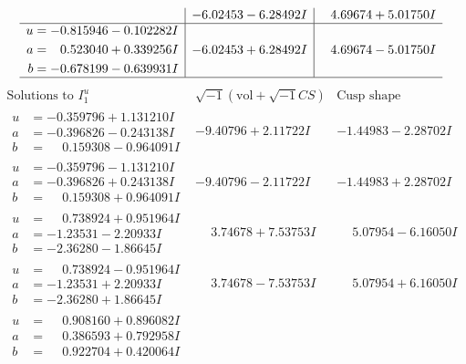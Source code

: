 \documentclass[1p]{elsarticle_modified}
\theoremstyle{definition}
\newcommand{\I}{\sqrt{-1}}
\begin{document}
$$\begin{array}{c|c|c}
 & -6.02453 - 6.28492 I & \phantom{-}4.69674 + 5.01750 I \\ \hline\begin{aligned}
u &= -0.815946 - 0.102282 I \\
a &= \phantom{-}0.523040 + 0.339256 I \\
b &= -0.678199 - 0.639931 I\end{aligned}
 & -6.02453 + 6.28492 I & \phantom{-}4.69674 - 5.01750 I\\
 \hline 
 \end{array}$$\newpage$$\begin{array}{c|c|c}  
\text{Solutions to }I^u_{1}& \I (\text{vol} + \sqrt{-1}CS) & \text{Cusp shape}\\
 \hline 
\begin{aligned}
u &= -0.359796 + 1.131210 I \\
a &= -0.396826 - 0.243138 I \\
b &= \phantom{-}0.159308 - 0.964091 I\end{aligned}
 & -9.40796 + 2.11722 I & -1.44983 - 2.28702 I \\ \hline\begin{aligned}
u &= -0.359796 - 1.131210 I \\
a &= -0.396826 + 0.243138 I \\
b &= \phantom{-}0.159308 + 0.964091 I\end{aligned}
 & -9.40796 - 2.11722 I & -1.44983 + 2.28702 I \\ \hline\begin{aligned}
u &= \phantom{-}0.738924 + 0.951964 I \\
a &= -1.23531 - 2.20933 I \\
b &= -2.36280 - 1.86645 I\end{aligned}
 & \phantom{-}3.74678 + 7.53753 I & \phantom{-}5.07954 - 6.16050 I \\ \hline\begin{aligned}
u &= \phantom{-}0.738924 - 0.951964 I \\
a &= -1.23531 + 2.20933 I \\
b &= -2.36280 + 1.86645 I\end{aligned}
 & \phantom{-}3.74678 - 7.53753 I & \phantom{-}5.07954 + 6.16050 I \\ \hline\begin{aligned}
u &= \phantom{-}0.908160 + 0.896082 I \\
a &= \phantom{-}0.386593 + 0.792958 I \\
b &= \phantom{-}0.922704 + 0.420064 I\end{aligned}

\end{array}$$
\end{document}
